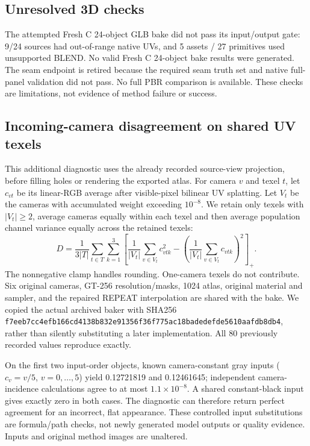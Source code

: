 \documentclass[11pt]{article}
\begin{document}
\subsection*{Unresolved 3D checks}



The attempted Fresh C 24-object GLB bake did not pass its input/output gate: 9/24 sources had out-of-range native UVs, and 5 assets / 27 primitives used unsupported BLEND. No valid Fresh C 24-object bake results were generated. The seam endpoint is retired because the required seam truth set and native full-panel validation did not pass. No full PBR comparison is available. These checks are limitations, not evidence of method failure or success.

\FloatBarrier
\subsection*{Incoming-camera disagreement on shared UV texels}
This additional diagnostic uses the already recorded source-view projection, before filling holes or rendering the exported atlas. For camera $v$ and texel $t$, let $c_{vt}$ be its linear-RGB average after visible-pixel bilinear UV splatting. Let $V_t$ be the cameras with accumulated weight exceeding $10^{-8}$. We retain only texels with $|V_t|\geq2$, average cameras equally within each texel and then average population channel variance equally across the retained texels:
\[
D=\frac{1}{3|T|}\sum_{t\in T}\sum_{k=1}^3\left[\frac{1}{|V_t|}\sum_{v\in V_t}c_{vtk}^{2}-\left(\frac{1}{|V_t|}\sum_{v\in V_t}c_{vtk}\right)^2\right]_+ .
\]
The nonnegative clamp handles rounding. One-camera texels do not contribute. Six original cameras, GT-256 resolution/masks, 1024 atlas, original material and sampler, and the repaired REPEAT interpolation are shared with the bake. We copied the actual archived baker with SHA256 \texttt{f7eeb7cc4efb166cd4138b832e91356f36f775ac18badedefde5610aafdb8db4}, rather than silently substituting a later implementation. All 80 previously recorded values reproduce exactly.

On the first two input-order objects, known camera-constant gray inputs ($c_v=v/5$, $v=0,\ldots,5$) yield 0.12721819 and 0.12461645; independent camera-incidence calculations agree to at most $1.1\times10^{-8}$. A shared constant-black input gives exactly zero in both cases. The diagnostic can therefore return perfect agreement for an incorrect, flat appearance. These controlled input substitutions are formula/path checks, not newly generated model outputs or quality evidence. Inputs and original method images are unaltered.
\end{document}
